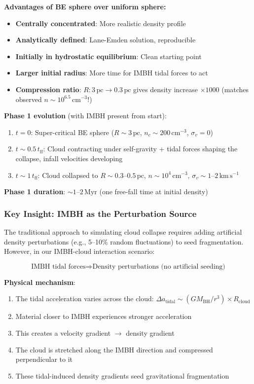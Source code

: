 \documentclass[11pt,a4paper]{article}
\newcommand{\kms}{\,\mathrm{km\,s^{-1}}}
\newcommand{\pc}{\,\mathrm{pc}}
\newcommand{\cmcubed}{\,\mathrm{cm^{-3}}}
\begin{document}
\textbf{Advantages of BE sphere over uniform sphere:}
\begin{itemize}
    \item \textbf{Centrally concentrated}: More realistic density profile
    \item \textbf{Analytically defined}: Lane-Emden solution, reproducible
    \item \textbf{Initially in hydrostatic equilibrium}: Clean starting point
    \item \textbf{Larger initial radius}: More time for IMBH tidal forces to act
    \item \textbf{Compression ratio}: $R: 3\pc \to 0.3\pc$ gives density increase $\times 1000$
          (matches observed $n \sim 10^{6.5}\cmcubed$!)
\end{itemize}

\textbf{Phase 1 evolution} (with IMBH present from start):
\begin{enumerate}
    \item $t = 0$: Super-critical BE sphere ($R \sim 3\pc$, $n_c \sim 200\cmcubed$, $\sigma_v = 0$)
    \item $t \sim 0.5\,t_\mathrm{ff}$: Cloud contracting under self-gravity + tidal forces
          shaping the collapse, infall velocities developing
    \item $t \sim 1\,t_\mathrm{ff}$: Cloud collapsed to $R \sim 0.3$--$0.5\pc$,
          $n \sim 10^4\cmcubed$, $\sigma_v \sim 1$--$2\kms$
\end{enumerate}

\textbf{Phase 1 duration}: $\sim 1$--$2\,\mathrm{Myr}$ (one free-fall time at initial density)

\subsubsection{Key Insight: IMBH as the Perturbation Source}

The traditional approach to simulating cloud collapse requires adding artificial
density perturbations (e.g., 5--10\% random fluctuations) to seed fragmentation.
However, in our IMBH-cloud interaction scenario:

\begin{equation}
    \boxed{\text{IMBH tidal forces} \Rightarrow \text{Density perturbations (no artificial seeding)}}
\end{equation}

\textbf{Physical mechanism}:
\begin{enumerate}
    \item The tidal acceleration varies across the cloud:
          $\Delta a_\mathrm{tidal} \sim (G M_\mathrm{BH} / r^3) \times R_\mathrm{cloud}$
    \item Material closer to IMBH experiences stronger acceleration
    \item This creates a velocity gradient $\to$ density gradient
    \item The cloud is stretched along the IMBH direction and compressed perpendicular to it
    \item These tidal-induced density gradients seed gravitational fragmentation
\end{enumerate}
\end{document}
